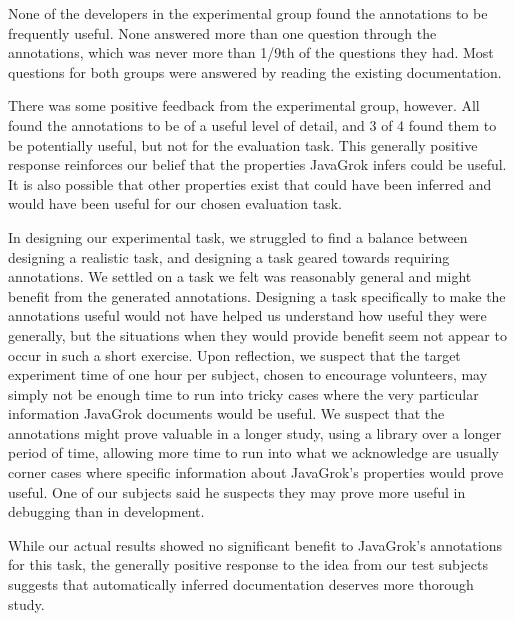 None of the developers in the experimental group found the annotations to be
frequently useful.  None answered more than one question through the
annotations, which was never more than 1/9th of the questions they had.  Most
questions for both groups were answered by reading the existing documentation.

There was some positive feedback from the experimental group, however.  All
found the annotations to be of a useful level of detail, and 3 of 4 found them
to be potentially useful, but not for the evaluation task.  This generally
positive response reinforces our belief that the properties
JavaGrok infers could be useful.  It is also possible that other properties
exist that could have been inferred and would have been useful for our chosen
evaluation task.

In designing
our experimental task, we struggled to find a balance between designing a
realistic task, and designing a task geared towards requiring annotations.  We
settled on a task we felt was reasonably general and might benefit from the
generated annotations.  Designing a task specifically to make the annotations useful would
not have helped us understand how useful they were generally, but the situations
when they would provide benefit seem not appear to occur in such a short exercise.
Upon reflection, we suspect that the target experiment time of one hour per
subject, chosen to encourage volunteers, may simply not be enough time to run
into tricky cases where the very particular information JavaGrok documents would
be useful.  We suspect that the annotations might prove valuable in a longer
study, using a library over a longer period of time, allowing more time to run
into what we acknowledge are usually corner cases where specific information
about JavaGrok's properties would prove useful.  One of our subjects said he
suspects they may prove more useful in debugging than in development.

While our actual results showed no significant benefit to JavaGrok's annotations
for this task, the generally positive response to the idea from our test
subjects suggests that automatically inferred documentation deserves more
thorough study.

